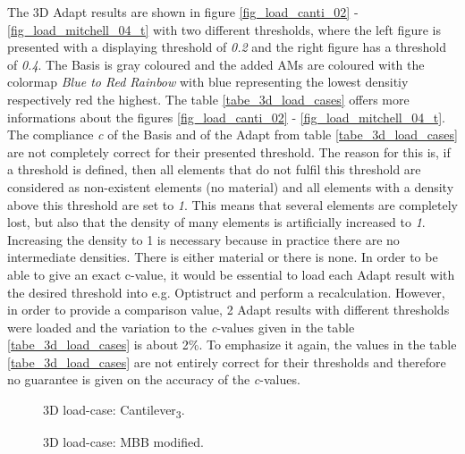  The 3D Adapt results are shown 
in figure \ref{fig_load_canti_02} - \ref{fig_load_mitchell_04_t} 
 with two different thresholds,
 where the left figure is presented with a displaying threshold of
 \emph{0.2} and the right figure has a threshold of
 \emph{0.4}. The Basis is gray coloured and the
 added AMs are coloured with the colormap 
 \emph{Blue to Red Rainbow} with
 blue representing the lowest densitiy respectively
 red the highest. The table \ref{tabe_3d_load_cases} 
 offers more informations about
 the figures \ref{fig_load_canti_02} - \ref{fig_load_mitchell_04_t}.
 The compliance \emph{c} of the Basis and of
 the Adapt from table \ref{tabe_3d_load_cases}
 are not completely correct for their presented threshold.
 The reason for this is, if a threshold is
  defined, then all elements that do not fulfil this threshold
   are considered as non-existent elements (no material) and 
   all elements with a density above this threshold are set to \emph{1}.
    This means that several elements are completely lost, but 
    also that the density of many elements is artificially 
    increased to \emph{1}. 
    Increasing the density to 1 is necessary because
     in practice there are no intermediate densities. 
     There is either material or there is none. In order 
     to be able to give an exact c-value, it would be
      essential to load each Adapt result with
       the desired threshold into e.g. Optistruct and 
       perform a recalculation. However, in order to provide a comparison value, 2 
       Adapt results with different thresholds were 
       loaded and the variation to the \emph{c}-values given in 
       the table
       \ref{tabe_3d_load_cases}
        is about 2\%. To emphasize it again,
        the values in the table
        \ref{tabe_3d_load_cases} 
        are not entirely 
        correct for their thresholds and therefore no guarantee is given on 
        the accuracy of the \emph{c}-values.

 
 
 \begin{figure} [!h]
\begin{minipage}{0.45\textwidth}
 \centering
 \def\svgwidth{\textwidth}
 
 \caption{3D load-case: Cantilever\textsubscript{3}.}    %
 \label{fig_load_case_clamped_cant}          %
\end{minipage}
\hfill
\begin{minipage}{0.45\textwidth}
 \centering
 \def\svgwidth{\textwidth}
 
 \vspace*{6mm}
 \caption{3D load-case: MBB modified.}    %
 \label{fig_load_case_MBB_modified}          %
\end{minipage}
\end{figure} ~\\

